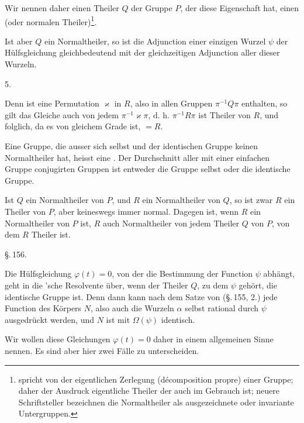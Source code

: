 
Wir nennen daher einen Theiler $Q$ der Gruppe $P$, der diese
Eigenschaft hat, einen  (oder normalen Theiler)\footnote{ spricht von der eigentlichen Zerlegung (d\'ecomposition propre) einer Gruppe; daher der Ausdruck \glqq{}eigentliche Theiler\grqq{} der auch im Gebrauch ist; neuere Schriftsteller bezeichnen die Normaltheiler als \glqq{}ausgezeichnete oder invariante Untergruppen\grqq{}.}.

Ist aber $Q$ ein Normaltheiler, so ist die Adjunction einer
einzigen Wurzel $\psi$ der H\"ulfsgleichung gleichbedeutend mit der
gleichzeitigen Adjunction aller dieser Wurzeln.

5. 

Denn ist eine Permutation $\varkappa$ in $R$, also in allen Gruppen
$\pi^{-1}Q\pi$ enthalten, so gilt das Gleiche auch von jedem $\pi^{-1}\varkappa\pi$,
d. h. $\pi^{-1}R\pi$ ist Theiler von $R$, und folglich, da es von gleichem
Grade ist, $= R$.

Eine Gruppe, die ausser sich selbst und der identischen
Gruppe keinen Normaltheiler hat, heisst eine .
Der Durchschnitt aller mit einer einfachen Gruppe conjugirten
Gruppen ist entweder die Gruppe selbst oder die identische Gruppe.

Ist $Q$ ein Normaltheiler von $P$, und $R$ ein Normaltheiler
von $Q$, so ist zwar $R$ ein Theiler von $P$, aber keineswegs immer
normal. Dagegen ist, wenn $R$ ein Normaltheiler von $P$ ist, $R$
auch Normaltheiler von jedem Theiler $Q$ von $P$, von dem $R$
Theiler ist.

\begin{center}
\S.\,156.

\end{center}

Die H\"ulfsgleichung $\varphi(t) = 0$, von der die Bestimmung der
Function $\psi$ abh\"angt, geht in die 'sche Resolvente \"uber,
wenn der Theiler $Q$, zu dem $\psi$ geh\"ort, die identische Gruppe
ist. Denn dann kann nach dem Satze von  (\S.\,155, 2.)
jede Function des K\"orpers $N$, also auch die Wurzeln $\alpha$ selbst
rational durch $\psi$ ausgedr\"uckt werden, und $N$ ist mit $\Omega(\psi)$
identisch.

Wir wollen diese Gleichungen $\varphi(t) = 0$ daher in einem allgemeinen Sinne  nennen. Es sind aber hier zwei
F\"alle zu unterscheiden.
